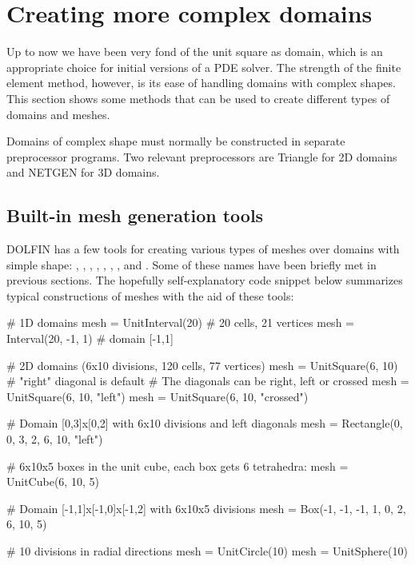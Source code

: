 \section{Creating more complex domains}
\label{langtangen:prepro}

Up to now we have been very fond of the unit square as domain,
which is an appropriate choice for initial versions of a
PDE solver. The strength of the finite element method, however, is its
ease of handling domains with complex shapes. This section
shows some methods that can be used to create different types of
domains and meshes.

Domains of complex shape must normally be constructed in separate
preprocessor programs. Two relevant preprocessors are Triangle for
2D domains and NETGEN for 3D domains.

\subsection{Built-in mesh generation tools}
\label{langtangen:prepro:builtin}

DOLFIN has a few tools for creating various types of meshes over
domains with simple
shape:
,
,
,
,
,
,
,
and
.
Some of these names have been briefly met in previous sections.
The hopefully self-explanatory code snippet below summarizes
typical constructions of meshes with the aid of these tools:
\begin{python}
# 1D domains
mesh = UnitInterval(20)     # 20 cells, 21 vertices
mesh = Interval(20, -1, 1)  # domain [-1,1]

# 2D domains (6x10 divisions, 120 cells, 77 vertices)
mesh = UnitSquare(6, 10)  # "right" diagonal is default
# The diagonals can be right, left or crossed
mesh = UnitSquare(6, 10, "left")
mesh = UnitSquare(6, 10, "crossed")

# Domain [0,3]x[0,2] with 6x10 divisions and left diagonals
mesh = Rectangle(0, 0, 3, 2, 6, 10, "left")

# 6x10x5 boxes in the unit cube, each box gets 6 tetrahedra:
mesh = UnitCube(6, 10, 5)

# Domain [-1,1]x[-1,0]x[-1,2] with 6x10x5 divisions
mesh = Box(-1, -1, -1, 1, 0, 2, 6, 10, 5)

# 10 divisions in radial directions
mesh = UnitCircle(10)
mesh = UnitSphere(10)
\end{python}

